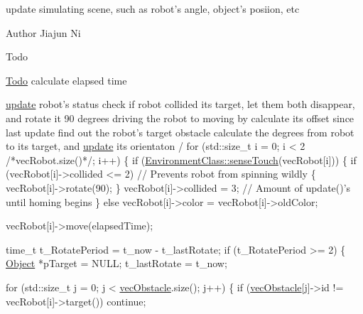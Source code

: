update simulating scene, such as robot's angle, object's posiion, etc

\begin{DoxyAuthor}{Author}
Jiajun Ni 
\end{DoxyAuthor}
\begin{DoxyRefDesc}{Todo}
\item[\hyperlink{todo__todo000005}{Todo}]calculate elapsed time \end{DoxyRefDesc}



\begin{DoxyCode}
   \hyperlink{classEnvironmentClass_a2ea61074efd8e3f099e2876a101c219f}{update} robot\textcolor{stringliteral}{'s status}
\textcolor{stringliteral}{   check if robot collided its target, let them both disappear, and rotate it 90 degrees}
\textcolor{stringliteral}{   driving the robot to moving by calculate its offset since last update}
\textcolor{stringliteral}{   find out the robot'}s target obstacle
   calculate the degrees from robot to its target, and \hyperlink{classEnvironmentClass_a2ea61074efd8e3f099e2876a101c219f}{update} its orientaton
  / 
\textcolor{keywordflow}{for} (std::size\_t i = 0; i < 2 \textcolor{comment}{/*vecRobot.size()*/}; i++)
\{
        \textcolor{keywordflow}{if} (\hyperlink{classEnvironmentClass_a52f4e00b563733c2019204d16de139b9}{EnvironmentClass::senseTouch}(vecRobot[i]))
        \{
            \textcolor{keywordflow}{if} (vecRobot[i]->collided <= 2) \textcolor{comment}{// Prevents robot from spinning wildly}
            \{
                vecRobot[i]->rotate(90);
            \}
            vecRobot[i]->collided = 3; \textcolor{comment}{// Amount of update()'s until homing begins}
        \}
        \textcolor{keywordflow}{else}
            vecRobot[i]->color = vecRobot[i]->oldColor;

    vecRobot[i]->move(elapsedTime);
    
    time\_t t\_RotatePeriod = t\_now - t\_lastRotate;
    \textcolor{keywordflow}{if} (t\_RotatePeriod >= 2)
    \{
        \hyperlink{classObject}{Object} *pTarget = NULL;
        t\_lastRotate = t\_now;
        
        \textcolor{keywordflow}{for} (std::size\_t j = 0; j < \hyperlink{classEnvironmentClass_a738593c1c3ed257bea8f99f663f59d85}{vecObstacle}.size(); j++)
        \{
            \textcolor{keywordflow}{if} (\hyperlink{classEnvironmentClass_a738593c1c3ed257bea8f99f663f59d85}{vecObstacle}[j]->\textcolor{keywordtype}{id} != vecRobot[i]->target())
                \textcolor{keywordflow}{continue};
                

\end{DoxyCode}

